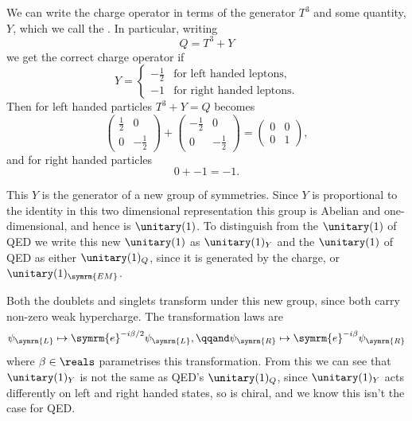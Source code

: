 \documentclass[fleqn]{NotesClass}
\newcommand{\e}{\symrm{e}}
\newcommand{\Left}{\symrm{L}}
\newcommand{\Right}{\symrm{R}}
\begin{document}
    We can write the charge operator in terms of the generator \(T^3\) and some quantity, \(Y\), which we call the .
    In particular, writing
    \begin{equation}
        Q = T^3 + Y
    \end{equation}
    we get the correct charge operator if
    \begin{equation}
        Y = 
        \begin{cases}
            -\frac{1}{2} & \text{for left handed leptons},\\
            -1 & \text{for right handed leptons}.
        \end{cases}
    \end{equation}
    Then for left handed particles \(T^3 + Y = Q\) becomes
    \begin{equation}
        \begin{pmatrix}
            \frac{1}{2} & 0\\
            0 & -\frac{1}{2}
        \end{pmatrix}
        +
        \begin{pmatrix}
            -\frac{1}{2} & 0\\
            0 & -\frac{1}{2}
        \end{pmatrix}
        =
        \begin{pmatrix}
            0 & 0\\
            0 & 1
        \end{pmatrix}
        ,
    \end{equation}
    and for right handed particles
    \begin{equation}
        0 + -1 = -1.
    \end{equation}
    
    This \(Y\) is the generator of a new group of symmetries.
    Since \(Y\) is proportional to the identity in this two dimensional representation this group is Abelian and one-dimensional, and hence is \(\unitary(1)\).
    To distinguish from the \(\unitary(1)\) of QED we write this new \(\unitary(1)\) as \(\unitary(1)_Y\) and the \(\unitary(1)\) of QED as either \(\unitary(1)_Q\), since it is generated by the charge, or \(\unitary(1)_{\symrm{EM}}\).
    
    Both the doublets and singlets transform under this new group, since both carry non-zero weak hypercharge.
    The transformation laws are
    \begin{equation}
        \psi_{\Left} \mapsto \e^{-i\beta/2}\psi_{\Left}, \qqand \psi_{\Right} \mapsto \e^{-i\beta}\psi_{\Right}
    \end{equation}
    where \(\beta \in \reals\) parametrises this transformation.
    From this we can see that \(\unitary(1)_{Y}\) is not the same as QED's \(\unitary(1)_{Q}\), since \(\unitary(1)_Y\) acts differently on left and right handed states, so is chiral, and we know this isn't the case for QED.
    
\end{document}
